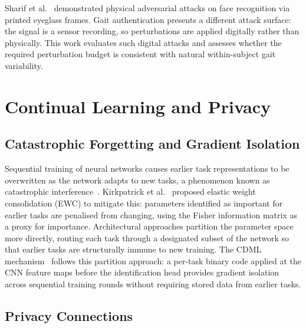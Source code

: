 Sharif et al.~\cite{sharif2016accessorize} demonstrated physical adversarial attacks on face recognition via printed eyeglass frames. Gait authentication presents a different attack surface: the signal is a sensor recording, so perturbations are applied digitally rather than physically. This work evaluates such digital attacks and assesses whether the required perturbation budget is consistent with natural within-subject gait variability.

\section{Continual Learning and Privacy}
\label{sec:rel_cl}

\subsection{Catastrophic Forgetting and Gradient Isolation}
\label{ssec:rel_cl_forgetting}

Sequential training of neural networks causes earlier task representations to be overwritten as the network adapts to new tasks, a phenomenon known as catastrophic interference~\cite{mccloskey1989catastrophic}. Kirkpatrick et al.~\cite{kirkpatrick2017overcoming} proposed elastic weight consolidation (EWC) to mitigate this: parameters identified as important for earlier tasks are penalised from changing, using the Fisher information matrix as a proxy for importance. Architectural approaches partition the parameter space more directly, routing each task through a designated subset of the network so that earlier tasks are structurally immune to new training. The CDML mechanism~\cite{milani2024gait} follows this partition approach: a per-task binary code applied at the CNN feature maps before the identification head provides gradient isolation across sequential training rounds without requiring stored data from earlier tasks.

\subsection{Privacy Connections}
\label{ssec:rel_cl_privacy}


